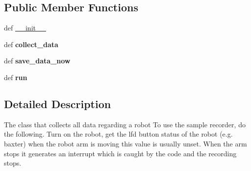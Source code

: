 \subsection*{Public Member Functions}
\begin{DoxyCompactItemize}
\item 
def \hyperlink{classaml__demos_1_1collect__robot__data_1_1_collect_robot_data_ac8644f09b7d5a1ed4dd235db59e5ab9b}{\-\_\-\-\_\-init\-\_\-\-\_\-}
\item 
\hypertarget{classaml__demos_1_1collect__robot__data_1_1_collect_robot_data_afae93440b8a2cd7ecc60bb7345eba322}{def {\bfseries collect\-\_\-data}}\label{classaml__demos_1_1collect__robot__data_1_1_collect_robot_data_afae93440b8a2cd7ecc60bb7345eba322}

\item 
\hypertarget{classaml__demos_1_1collect__robot__data_1_1_collect_robot_data_aeb31b2aa40679320d2353bb6a7d7c305}{def {\bfseries save\-\_\-data\-\_\-now}}\label{classaml__demos_1_1collect__robot__data_1_1_collect_robot_data_aeb31b2aa40679320d2353bb6a7d7c305}

\item 
\hypertarget{classaml__demos_1_1collect__robot__data_1_1_collect_robot_data_aa47c96043ddbfe1566600c02659c3bc0}{def {\bfseries run}}\label{classaml__demos_1_1collect__robot__data_1_1_collect_robot_data_aa47c96043ddbfe1566600c02659c3bc0}

\end{DoxyCompactItemize}


\subsection{Detailed Description}
\begin{DoxyVerb}The class that collects all data regarding a robot
To use the sample recorder, do the following.
Turn on the robot, get the lfd button status of the robot (e.g. baxter)
when the robot arm is moving this value is usually unset.
When the arm stops it generates an interrupt which is caught by the
code and the recording stops.
\end{DoxyVerb}
 

